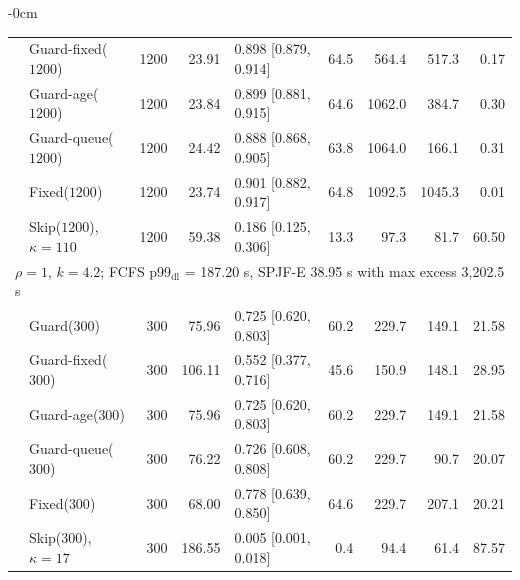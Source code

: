 \documentclass[mathematics,supfile,submit,moreauthors]{Definitions/mdpi}
\newcommand{\sealednum}[1]{#1}
\begin{document}
\begin{table}[htbp]
\begin{adjustwidth}{-\extralength}{0cm}
\begin{tabular}{llrrlrrrr}
 & Guard-fixed($\sealednum{1200}$) & \sealednum{1200} & \sealednum{23.91} & \sealednum{0.898 [0.879, 0.914]} & \sealednum{64.5} & \sealednum{564.4} & \sealednum{517.3} & \sealednum{0.17} \\
 & Guard-age($\sealednum{1200}$) & \sealednum{1200} & \sealednum{23.84} & \sealednum{0.899 [0.881, 0.915]} & \sealednum{64.6} & \sealednum{1062.0} & \sealednum{384.7} & \sealednum{0.30} \\
 & Guard-queue($\sealednum{1200}$) & \sealednum{1200} & \sealednum{24.42} & \sealednum{0.888 [0.868, 0.905]} & \sealednum{63.8} & \sealednum{1064.0} & \sealednum{166.1} & \sealednum{0.31} \\
 & Fixed($\sealednum{1200}$)     & \sealednum{1200} & \sealednum{23.74} & \sealednum{0.901 [0.882, 0.917]} & \sealednum{64.8} & \sealednum{1092.5} & \sealednum{1045.3} & \sealednum{0.01} \\
 & Skip($\sealednum{1200}$), $\kappa=110$ & \sealednum{1200} & \sealednum{59.38} & \sealednum{0.186 [0.125, 0.306]} & \sealednum{13.3} & \sealednum{97.3} & \sealednum{81.7} & \sealednum{60.50} \\
\midrule
\multicolumn{9}{l}{$\rho = \sealednum{1}$, $k = \sealednum{4.2}$; FCFS p99$_{\mathrm{dl}}$ = \sealednum{187.20} s, SPJF-E \sealednum{38.95} s with max excess \sealednum{3{,}202.5} s} \\
 & Guard($\sealednum{300}$)      & \sealednum{300} & \sealednum{75.96} & \sealednum{0.725 [0.620, 0.803]} & \sealednum{60.2} & \sealednum{229.7} & \sealednum{149.1} & \sealednum{21.58} \\
 & Guard-fixed($\sealednum{300}$) & \sealednum{300} & \sealednum{106.11} & \sealednum{0.552 [0.377, 0.716]} & \sealednum{45.6} & \sealednum{150.9} & \sealednum{148.1} & \sealednum{28.95} \\
 & Guard-age($\sealednum{300}$)  & \sealednum{300} & \sealednum{75.96} & \sealednum{0.725 [0.620, 0.803]} & \sealednum{60.2} & \sealednum{229.7} & \sealednum{149.1} & \sealednum{21.58} \\
 & Guard-queue($\sealednum{300}$) & \sealednum{300} & \sealednum{76.22} & \sealednum{0.726 [0.608, 0.808]} & \sealednum{60.2} & \sealednum{229.7} & \sealednum{90.7} & \sealednum{20.07} \\
 & Fixed($\sealednum{300}$)      & \sealednum{300} & \sealednum{68.00} & \sealednum{0.778 [0.639, 0.850]} & \sealednum{64.6} & \sealednum{229.7} & \sealednum{207.1} & \sealednum{20.21} \\
 & Skip($\sealednum{300}$), $\kappa=17$ & \sealednum{300} & \sealednum{186.55} & \sealednum{0.005 [0.001, 0.018]} & \sealednum{0.4} & \sealednum{94.4} & \sealednum{61.4} & \sealednum{87.57} \\

\end{tabular}
\end{adjustwidth}
\end{table}
\end{document}
